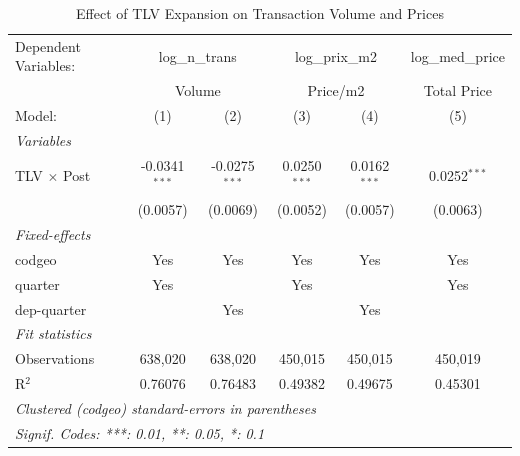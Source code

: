 
\begin{table}[htbp]
   \caption{\label{tab:did_main} Effect of TLV Expansion on Transaction Volume and Prices}
   \centering
   \begin{tabular}{lccccc}
      \tabularnewline \midrule \midrule
      Dependent Variables: & \multicolumn{2}{c}{log\_n\_trans} & \multicolumn{2}{c}{log\_prix\_m2} & log\_med\_price\\
       & \multicolumn{2}{c}{Volume} & \multicolumn{2}{c}{Price/m2} & Total Price \\ 
      Model:             & (1)             & (2)             & (3)            & (4)            & (5)\\  
      \midrule
      \emph{Variables}\\
      TLV $\times$ Post  & -0.0341$^{***}$ & -0.0275$^{***}$ & 0.0250$^{***}$ & 0.0162$^{***}$ & 0.0252$^{***}$\\   
                         & (0.0057)        & (0.0069)        & (0.0052)       & (0.0057)       & (0.0063)\\   
      \midrule
      \emph{Fixed-effects}\\
      codgeo             & Yes             & Yes             & Yes            & Yes            & Yes\\  
      quarter            & Yes             &                 & Yes            &                & Yes\\  
      dep-quarter        &                 & Yes             &                & Yes            & \\  
      \midrule
      \emph{Fit statistics}\\
      Observations       & 638,020         & 638,020         & 450,015        & 450,015        & 450,019\\  
      R$^2$              & 0.76076         & 0.76483         & 0.49382        & 0.49675        & 0.45301\\  
      \midrule \midrule
      \multicolumn{6}{l}{\emph{Clustered (codgeo) standard-errors in parentheses}}\\
      \multicolumn{6}{l}{\emph{Signif. Codes: ***: 0.01, **: 0.05, *: 0.1}}\\
   \end{tabular}
\end{table}


